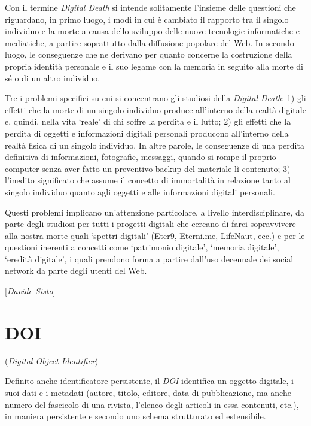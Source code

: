 {Con il termine \emph{Digital Death} si intende solitamente l'insieme
delle questioni che riguardano, in primo luogo, i modi in cui è cambiato
il rapporto tra il singolo individuo e la morte a causa dello sviluppo
delle nuove tecnologie informatiche e mediatiche, a partire soprattutto
dalla diffusione popolare del Web. In secondo luogo, le conseguenze che
ne derivano per quanto concerne la costruzione della propria identità
personale e il suo legame con la memoria in seguito alla morte di sé o
di un altro individuo.

Tre i problemi specifici su cui si concentrano gli studiosi della
\emph{Digital Death}: 1) gli effetti che la morte di un singolo
individuo produce all'interno della realtà digitale e, quindi, nella
vita `reale' di chi soffre la perdita e il lutto; 2) gli effetti che la
perdita di oggetti e informazioni digitali personali producono
all'interno della realtà fisica di un singolo individuo. In altre
parole, le conseguenze di una perdita definitiva di informazioni,
fotografie, messaggi, quando si rompe il proprio computer senza aver
fatto un preventivo backup del materiale lì contenuto; 3) l'inedito
significato che assume il concetto di immortalità in relazione tanto al
singolo individuo quanto agli oggetti e alle informazioni digitali
personali.

Questi problemi implicano un'attenzione particolare, a livello
interdisciplinare, da parte degli studiosi per tutti i progetti digitali
che cercano di farci sopravvivere alla nostra morte quali `spettri
digitali' (Eter9, Eterni.me, LifeNaut, ecc.) e per le questioni inerenti
a concetti come `patrimonio digitale', `memoria digitale', `eredità
digitale', i quali prendono forma a partire dall'uso decennale dei
social network da parte degli utenti del Web.

\hrulefill 

{[}\emph{Davide Sisto}{]}



\chapter{DOI}

(\emph{Digital Object Identifier})

Definito anche identificatore persistente, il \emph{DOI} identifica un
oggetto digitale, i suoi dati e i metadati (autore, titolo, editore,
data di pubblicazione, ma anche numero del fascicolo di una rivista,
l'elenco degli articoli in essa contenuti, etc.), in maniera persistente
e secondo uno schema strutturato ed estensibile.

}

